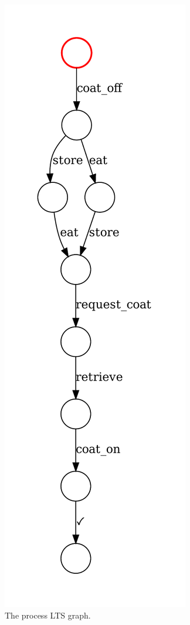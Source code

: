 \begin{figure}[htb]
	\caption[The process LTS graph]{The process LTS graph.}
	\label{lts-example}
	\begin{center}
		\includegraphics[scale=0.5]{images/LTS.pdf}
	\end{center}
\end{figure}


